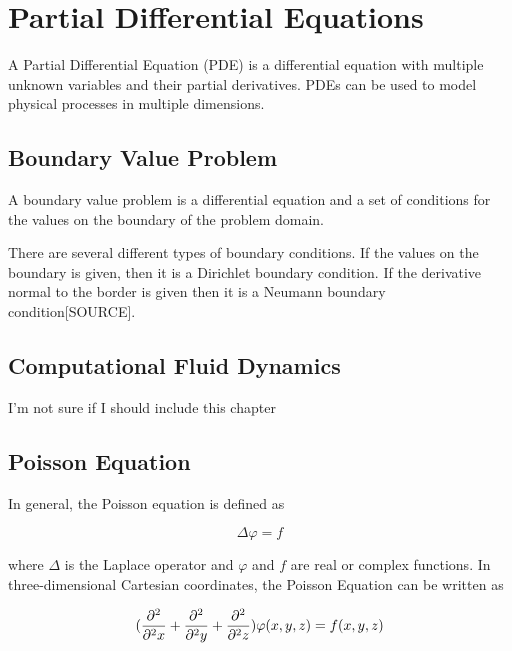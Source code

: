 \section*{Partial Differential Equations}

A Partial Differential Equation (PDE) is a differential equation with multiple 
unknown variables and their partial derivatives. PDEs can be used to model physical 
processes in multiple dimensions. 

\subsection*{Boundary Value Problem}

A boundary value problem is a differential equation and a set of conditions for the values on the boundary of the problem domain. 

There are several different types of boundary conditions. If the values on the boundary is given, then it is a Dirichlet boundary condition. If the derivative normal to the border is given then it is a Neumann boundary condition[SOURCE].

\subsection*{Computational Fluid Dynamics}

I'm not sure if I should include this chapter

\subsection*{Poisson Equation}

In general, the Poisson equation is defined as 

$$\Delta \varphi = f$$

where $\Delta$ is the Laplace operator and $\varphi$ and $f$ are real or complex 
functions. In three-dimensional Cartesian coordinates, the Poisson Equation can 
be written as 

$$(\frac{\partial^2}{\partial^2 x} + \frac{\partial^2}{\partial^2 y} + \frac{\partial^2}{\partial^2 z}) \varphi (x, y, z) = f(x, y, z)$$

